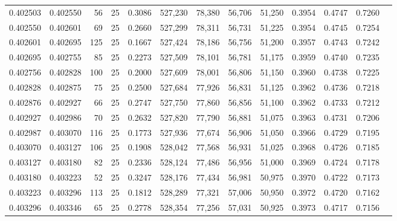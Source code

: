 \begin{tabular}{rrrrrrrrrrrrr}
0.402503 & 0.402550 &    56 &  25 &                                     0.3086 & 527,230 &  78,380 &  56,706 &  51,250 & 0.3954 & 0.4747 & 0.7260 \\
0.402550 & 0.402601 &    69 &  25 &                                     0.2660 & 527,299 &  78,311 &  56,731 &  51,225 & 0.3954 & 0.4745 & 0.7254 \\
0.402601 & 0.402695 &   125 &  25 &                                     0.1667 & 527,424 &  78,186 &  56,756 &  51,200 & 0.3957 & 0.4743 & 0.7242 \\
0.402695 & 0.402755 &    85 &  25 &                                     0.2273 & 527,509 &  78,101 &  56,781 &  51,175 & 0.3959 & 0.4740 & 0.7235 \\
0.402756 & 0.402828 &   100 &  25 &                                     0.2000 & 527,609 &  78,001 &  56,806 &  51,150 & 0.3960 & 0.4738 & 0.7225 \\
0.402828 & 0.402875 &    75 &  25 &                                     0.2500 & 527,684 &  77,926 &  56,831 &  51,125 & 0.3962 & 0.4736 & 0.7218 \\
0.402876 & 0.402927 &    66 &  25 &                                     0.2747 & 527,750 &  77,860 &  56,856 &  51,100 & 0.3962 & 0.4733 & 0.7212 \\
0.402927 & 0.402986 &    70 &  25 &                                     0.2632 & 527,820 &  77,790 &  56,881 &  51,075 & 0.3963 & 0.4731 & 0.7206 \\
0.402987 & 0.403070 &   116 &  25 &                                     0.1773 & 527,936 &  77,674 &  56,906 &  51,050 & 0.3966 & 0.4729 & 0.7195 \\
0.403070 & 0.403127 &   106 &  25 &                                     0.1908 & 528,042 &  77,568 &  56,931 &  51,025 & 0.3968 & 0.4726 & 0.7185 \\
0.403127 & 0.403180 &    82 &  25 &                                     0.2336 & 528,124 &  77,486 &  56,956 &  51,000 & 0.3969 & 0.4724 & 0.7178 \\
0.403180 & 0.403223 &    52 &  25 &                                     0.3247 & 528,176 &  77,434 &  56,981 &  50,975 & 0.3970 & 0.4722 & 0.7173 \\
0.403223 & 0.403296 &   113 &  25 &                                     0.1812 & 528,289 &  77,321 &  57,006 &  50,950 & 0.3972 & 0.4720 & 0.7162 \\
0.403296 & 0.403346 &    65 &  25 &                                     0.2778 & 528,354 &  77,256 &  57,031 &  50,925 & 0.3973 & 0.4717 & 0.7156 \\

\end{tabular}
